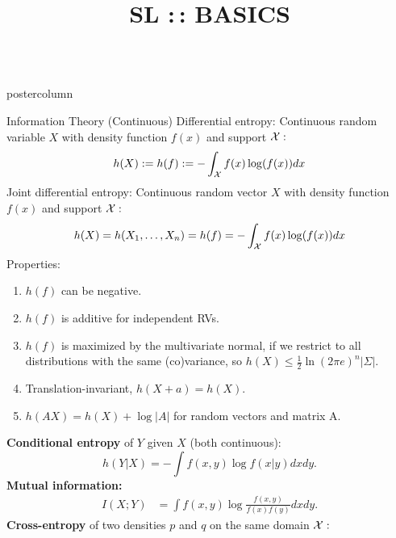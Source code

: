 \documentclass{beamer}
\title{SL :\,: BASICS} %
\newlength{\columnheight} %
\begin{document}
\begin{frame}[fragile]{}
\vspace{-8ex}
\begin{columns}
	\begin{column}{.31\textwidth}
		\begin{beamercolorbox}[center]{postercolumn}
			\begin{minipage}{.98\textwidth}
				\parbox[t][\columnheight]{\textwidth}{
\begin{myblock}{Information Theory (Continuous)}
%	
%	
	Differential entropy: Continuous random variable $X$ with density function $f(x)$ and support $\mathcal{X}:$
%	
		$$ h(X) := h(f) := - \int_{\mathcal{X}} f(x) \log(f(x)) dx $$
%
	Joint differential entropy: Continuous random vector $X$ with density function $f(x)$ and support $\mathcal{X}:$
%	
		$$ h(X) = h(X_1, \ldots, X_n) = h(f) = - \int_{\mathcal{X}} f(x) \log(f(x)) dx $$
%
	Properties:
%	
	\begin{enumerate}
		\setlength{\itemindent}{+.3in}
	\item $h(f)$ can be negative.
	\item $h(f)$ is additive for independent RVs.
	\item $h(f)$ is maximized by the multivariate normal, if we restrict 
	to all distributions with the same (co)variance, so
	$h(X) \leq \frac{1}{2} \ln(2 \pi e)^n |\Sigma|.$
	\item Translation-invariant, $ h(X+a) = h(X)$. 
	\item $h(AX) = h(X) + \log |A|$ for random vectors and matrix A.
	\end{enumerate}
%
	\textbf{Conditional entropy} of $Y$ given $X$ (both continuous):
	$$h(Y|X) = - \int f(x,y) \log f(x|y) dx dy.$$
	\textbf{Mutual information:}
%	 
	\begin{equation*}\begin{aligned}
			I(X ; Y) &= \int f(x,y) \log \frac{f(x,y)}{f(x)f(y)} dx dy.
		\end{aligned}
	\end{equation*}
%
	\textbf{Cross-entropy} of two densities $p$ and $q$ on the same domain $\mathcal{X}:$

\end{myblock}}
\end{minipage}
\end{beamercolorbox}
\end{column}
\end{columns}
\end{frame}
\end{document}
